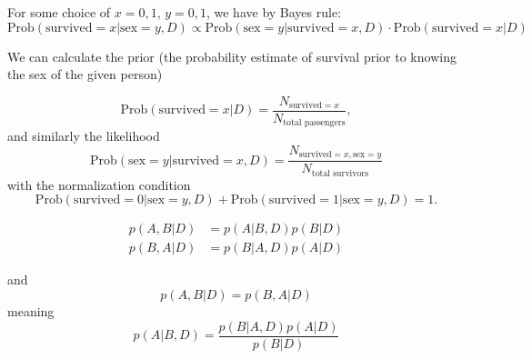 \documentclass{book}
\begin{document}
For some choice of $x=0,1$, $y=0,1$, we have by Bayes rule:
\begin{equation}
    \text{Prob}(\text{survived}=x | \text{sex}=y, D) \propto \text{Prob}( \text{sex}=y|\text{survived}=x,D ) \cdot \text{Prob}(\text{survived}=x|D)
\end{equation}

We can calculate the prior (the probability estimate of survival prior to knowing the sex of the given person)

\begin{equation}
    \text{Prob}(\text{survived}=x|D) = \frac{N_{\text{survived}=x}}{N_\text{total passengers}},
\end{equation}
and similarly the likelihood
\begin{equation}
    \text{Prob}(\text{sex}=y|\text{survived}=x, D) = \frac{N_{\text{survived}=x, \text{sex}=y}}{N_\text{total survivors}}
\end{equation}
with the normalization condition 
\begin{equation}
    \text{Prob}(\text{survived}=0|\text{sex}=y, D) + \text{Prob}(\text{survived}=1|\text{sex}=y, D) = 1.
\end{equation}






\clearpage
\begin{equation}
    \begin{split}
        p(A,B|D) & = p(A|B,D)p(B|D) \\
        p(B,A|D) & = p(B|A,D)p(A|D)
    \end{split}
\end{equation}

and
\begin{equation}
    p(A,B|D) = p(B,A|D)
\end{equation}
meaning 
\begin{equation}
    p(A|B,D) =  \frac{p(B|A,D)p(A|D)}{p(B|D)}
\end{equation}




\clearpage
\end{document}
